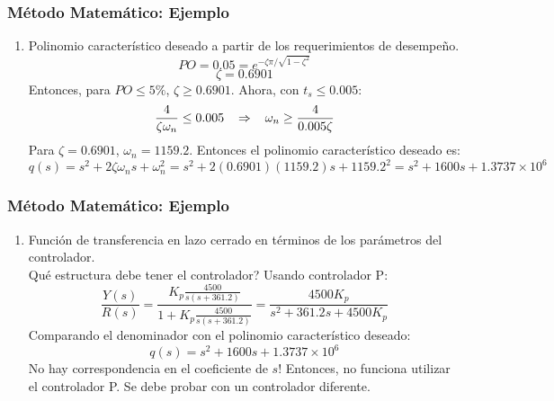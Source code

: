 \documentclass[aspectratio=169,handout]{beamer}
\theoremstyle{definition}
\theoremstyle{plain}
\theoremstyle{remark}
\newcounter{saveenumi}
\newcommand{\seti}{\setcounter{saveenumi}{\value{enumi}}}
\newcommand{\conti}{\setcounter{enumi}{\value{saveenumi}}}
\begin{document}
\begin{frame}[<+->]\frametitle{Método Matemático: Ejemplo}
\begin{enumerate}
	\item Polinomio característico deseado a partir de los requerimientos de desempeño.
	\begin{equation*}
		PO = 0.05 = e^{-\zeta \pi / \sqrt{1-\zeta^2}}
	\end{equation*}
	\begin{equation*}
		\zeta = 0.6901
	\end{equation*}
	Entonces, para $PO \leq 5\%$, $\zeta \geq 0.6901$. Ahora, con $t_s \leq 0.005$:
	\begin{equation*}
		\frac{4}{\zeta \omega_n} \leq 0.005 \hspace*{3mm} \Rightarrow \hspace*{3mm} \omega_n \geq \frac{4}{0.005\zeta}
	\end{equation*}
	Para $\zeta = 0.6901$, $\omega_n = 1159.2$. Entonces el polinomio característico deseado es:
	\begin{equation*}
		q(s) = s^2 + 2 \zeta \omega_n s + \omega_n^2 = s^2 + 2(0.6901)(1159.2)s + 1159.2^2 = s^2 + 1600s +1.3737\times 10^6
	\end{equation*}
	\seti
\end{enumerate}
\end{frame}

\begin{frame}[<+->]\frametitle{Método Matemático: Ejemplo}
\begin{enumerate}
	\conti
	\item Función de transferencia en lazo cerrado en términos de los parámetros del controlador.\\
	Qué estructura debe tener el controlador? Usando controlador P:
	\begin{equation*}
		\frac{Y(s)}{R(s)} = \frac{K_p\frac{4500}{s(s+361.2)}}{1 + K_p\frac{4500}{s(s+361.2)}} = \frac{4500 K_p}{s^2 + 361.2s + 4500K_p}
	\end{equation*}
	Comparando el denominador con el polinomio característico deseado: 
	\begin{equation*}
		q(s) = s^2 + 1600s +1.3737\times 10^6
	\end{equation*}
	No hay correspondencia en el coeficiente de $s$! Entonces, no funciona utilizar el controlador P. Se debe probar con un controlador diferente.
	\seti
\end{enumerate}	
\end{frame}
\end{document}

